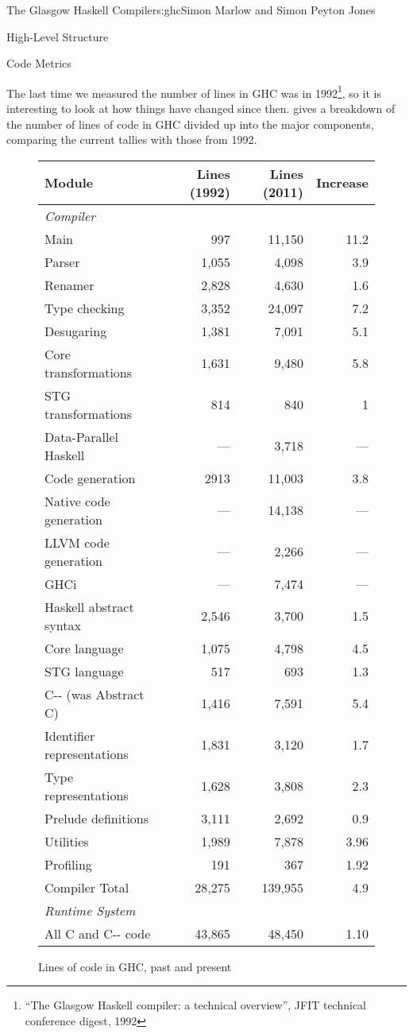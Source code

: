 \begin{aosachapter}{The Glasgow Haskell Compiler}{s:ghc}{Simon Marlow and Simon Peyton Jones}
\begin{aosasect1}{High-Level Structure}
\begin{aosasect2}{Code Metrics}

The last time we measured the number of lines in GHC was in
1992\footnote{``The Glasgow Haskell compiler: a technical overview'',
  JFIT technical conference digest, 1992}, so it is interesting to
look at how things have changed since then.  
gives a breakdown of the number of lines of code in GHC divided up
into the major components, comparing the current tallies with those
from 1992.

\begin{figure}[h!]
\centering
\begin{tabular}{lrrr}
\hline
Module & Lines (1992) & Lines (2011) & Increase \\
\hline
\multicolumn{4}{l}{\emph{Compiler}} \\
Main    & 997 & 11,150 & 11.2 \\
Parser  & 1,055 & 4,098 & 3.9 \\
Renamer & 2,828 & 4,630 & 1.6 \\
Type checking & 3,352 & 24,097 & 7.2 \\
Desugaring & 1,381 & 7,091 & 5.1 \\
Core transformations & 1,631 & 9,480 & 5.8 \\
STG transformations & 814 & 840 & 1 \\
Data-Parallel Haskell & --- & 3,718 & --- \\
Code generation & 2913 & 11,003 & 3.8 \\
Native code generation & --- & 14,138 & --- \\
LLVM code generation & --- & 2,266 & --- \\
GHCi & --- & 7,474 & --- \\
Haskell abstract syntax & 2,546 & 3,700 & 1.5 \\
Core language & 1,075 & 4,798 & 4.5 \\
STG language & 517 & 693 & 1.3 \\
C{-}{-} (was Abstract C)  & 1,416 & 7,591 & 5.4 \\
Identifier representations & 1,831 & 3,120 & 1.7 \\
Type representations & 1,628 & 3,808 & 2.3 \\
Prelude definitions & 3,111 & 2,692 & 0.9 \\
Utilities & 1,989 & 7,878 & 3.96 \\
Profiling & 191 & 367 & 1.92 \\
\hline
Compiler Total  & 28,275 & 139,955 & 4.9 \\ \hline
\hline
\multicolumn{4}{l}{\emph{Runtime System}} \\
All C and C{-}{-} code & 43,865 & 48,450 & 1.10 \\
\hline
\end{tabular}
\caption{Lines of code in GHC, past and present}
\label{f:lines}
\end{figure}


\end{aosasect2}
\end{aosasect1}
\end{aosachapter}
